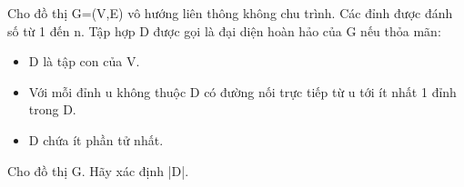 Cho đồ thị G=(V,E) vô hướng liên thông không chu trình. Các đỉnh được đánh số từ 1 đến n. Tập hợp D được gọi là đại diện hoàn hảo của G nếu thỏa mãn:  
\begin{itemize}
	\item     D là tập con của V.   
	\item     Với mỗi đỉnh u không thuộc D có đường nối trực tiếp từ u tới ít nhất 1 đỉnh trong D.   
	\item     D chứa ít phần tử nhất.   
\end{itemize}

   Cho đồ thị G. Hãy xác định |D|.